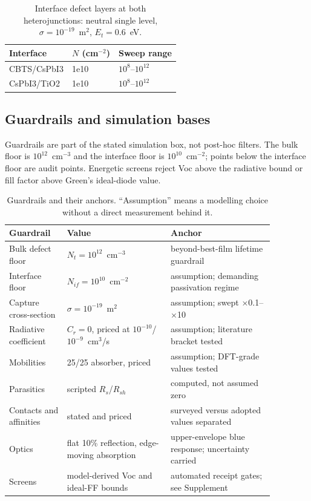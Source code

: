 \documentclass[11pt,a4paper]{article}
\begin{document}
\begin{table}[tbp]
\centering
\caption{Interface defect layers at both heterojunctions: neutral single level, $\sigma=10^{-19}$~m$^2$, $E_t=0.6$~eV.}
\label{tab:if}
\begin{tabular}{|l|l|l|}
\hline\hline
Interface & $N$ (cm$^{-2}$) & Sweep range \\
\hline
CBTS/CsPbI3 & 1e10 & $10^8$--$10^{12}$ \\
CsPbI3/TiO2 & 1e10 & $10^8$--$10^{12}$ \\
\hline\hline
\end{tabular}
\end{table}

\subsection{Guardrails and simulation bases}

Guardrails are part of the stated simulation box, not post-hoc filters. The bulk floor is $10^{12}$~cm$^{-3}$ and the interface floor is $10^{10}$~cm$^{-2}$; points below the interface floor are audit points. Energetic screens reject Voc above the radiative bound or fill factor above Green's ideal-diode value.

\begin{table}[tbp]
\centering
\caption{Guardrails and their anchors. ``Assumption'' means a modelling choice without a direct measurement behind it.}
\label{tab:guard}
\small
\begingroup
\setlength{\tabcolsep}{3pt}\begin{tabular}{|p{0.19\linewidth}|p{0.34\linewidth}|p{0.34\linewidth}|}
\hline\hline
Guardrail & Value & Anchor \\
\hline
Bulk defect floor & $N_t=10^{12}$~cm$^{-3}$ & beyond-best-film lifetime guardrail \\
Interface floor & $N_{if}=10^{10}$~cm$^{-2}$ & assumption; demanding passivation regime \\
Capture cross-section & $\sigma=10^{-19}$~m$^2$ & assumption; swept $\times$0.1--$\times$10 \\
Radiative coefficient & $C_r=0$, priced at $10^{-10}$/$10^{-9}$~cm$^3$/s & assumption; literature bracket tested \\
Mobilities & 25/25 absorber, priced & assumption; DFT-grade values tested \\
Parasitics & scripted $R_s$/$R_{sh}$ & computed, not assumed zero \\
Contacts and affinities & stated and priced & surveyed versus adopted values separated \\
Optics & flat 10\% reflection, edge-moving absorption & upper-envelope blue response; uncertainty carried \\
Screens & model-derived Voc and ideal-FF bounds & automated receipt gates; see Supplement \\
\hline\hline
\end{tabular}
\endgroup
\end{table}
\end{document}
